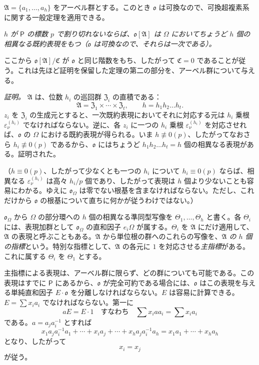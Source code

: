 $\mathfrak A=\{a_1,\ldots,a_h\}$ をアーベル群とする。このとき $\mathfrak o$ は可換なので、可換超複素系に関する一般定理を適用できる。

\emph{$h$ が $\mathsf P$ の標数 $p$ で割り切れないならば、$\mathfrak o[\mathfrak A]$ は $\Omega$ においてちょうど $h$ 個の相異なる既約表現をもつ（$\mathfrak o$ は可換なので、それらは一次である）。}

ここから $\mathfrak o[\mathfrak A]/\mathfrak C$ が $\mathfrak o$ と同じ階数をもち、したがって $\mathfrak C=0$ であることが従う。これは先ほど証明を保留した定理の第二の部分を、アーベル群について与える。

\emph{証明。} $\mathfrak A$ は、位数 $h_i$ の巡回群 $\mathfrak Z_i$ の直積である：
\[
\mathfrak A=\mathfrak Z_1\times\cdots\times\mathfrak Z_t,\qquad
h=h_1h_2\ldots h_t .
\]
$z_i$ を $\mathfrak Z_i$ の生成元とすると、一次既約表現においてそれに対応する元は $h_i$ 乗根 $\varepsilon_\nu^{(h_i)}$ でなければならない。逆に、各 $z_i$ に一つの $h_i$ 乗根 $\varepsilon_\nu^{(h_i)}$ を対応させれば、$\mathfrak o$ の $\Omega$ における既約表現が得られる。いま $h\not\equiv0(p)$、したがってなおさら $h_i\not\equiv0(p)$ であるから、$\mathfrak o$ にはちょうど $h_1h_2\ldots h_t=h$ 個の相異なる表現がある。証明された。

（$h\equiv0(p)$、したがって少なくとも一つの $h_i$ について $h_i\equiv0(p)$ ならば、相異なる $\varepsilon_\nu^{(h_i)}$ は高々 $h_i/p$ 個であり、したがって表現は $h$ 個より少ないことも容易にわかる。ゆえに $\mathfrak o_\Omega$ は零でない根基を含まなければならない。ただし、これだけから $\mathfrak o$ の根基について直ちに何かが従うわけではない。）

$\mathfrak o_\Omega$ から $\Omega$ の部分環への $h$ 個の相異なる準同型写像を $\Theta_1,\ldots,\Theta_h$ と書く。各 $\Theta_i$ には、表現加群として $\mathfrak o_\Omega$ の直和因子 $e_i\Omega$ が属する。$\Theta_i$ を $\mathfrak A$ にだけ適用して、$\mathfrak A$ の表現と呼ぶこともある。$\mathfrak A$ から単位根の群へのこれらの写像を、\emph{$\mathfrak A$ の $h$ 個の指標}という。特別な指標として、$\mathfrak A$ の各元に $1$ を対応させる\emph{主指標}がある。これに属する $\Theta_i$ を $\Theta_1$ とする。

主指標による表現は、アーベル群に限らず、どの群についても可能である。この表現はすでに $\mathsf P$ にあるから、$\mathfrak o$ が完全可約である場合には、$\mathfrak o$ はこの表現を与える単純直和因子 $E\cdot\mathfrak o$ を分離しなければならない。$E$ は容易に計算できる。$E=\sum x_i a_i$ でなければならない。第一に
\[
aE=E\cdot 1\quad\text{すなわち}\quad \sum x_i a a_i=\sum x_i a_i
\]
である。$a=a_j a_i^{-1}$ とすれば
\[
x_1a_ja_i^{-1}a_1+\cdots+x_i a_j+\cdots+x_ha_ja_i^{-1}a_h
=x_1a_1+\cdots+x_ha_h
\]
となり、したがって
\[
x_i=x_j
\]
が従う。

